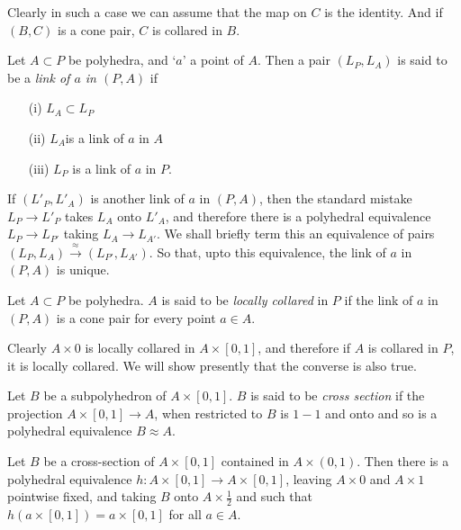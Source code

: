 Clearly in such a case we can assume that the map on $C$ is the identity. And if $(B,C)$ is a cone pair, $C$ is collared in $B$.

\begin{definition}\label{chap6-defi6.4.10}
Let $A\subset P$ be polyhedra, and `$a$' a point of $A$. Then a pair $(L_{P},L_{A})$ is said to be a {\em link of $a$ in $(P,A)$} if 
\begin{itemize}
\item[(i)] $L_{A}\subset L_{P}$

\item[(ii)] $L_{A}$\pageoriginale is a link of $a$ in $A$

\item[(iii)] $L_{P}$ is a link of $a$ in $P$.
\end{itemize}
\end{definition}

If $(L'_{P},L'_{A})$ is another link of $a$ in $(P,A)$, then the standard mistake $L_{P}\to L'_{P}$ takes $L_{A}$ onto $L'_{A}$, and therefore there is a polyhedral equivalence $L_{P}\to L_{P'}$ taking $L_{A}\to L_{A'}$. We shall briefly term this an equivalence of pairs $(L_{P},L_{A})\xrightarrow{\approx}(L_{P'},L_{A'})$. So that, upto this equivalence, the link of $a$ in $(P,A)$ is unique.

\begin{definition}\label{chap6-defi6.4.11}
Let $A\subset P$ be polyhedra. $A$ is said to be {\em locally collared} in $P$ if the link of $a$ in $(P,A)$ is a cone pair for every point $a\in A$.
\end{definition}

Clearly $A\times 0$ is locally collared in $A\times [0,1]$, and therefore if $A$ is collared in $P$, it is locally collared. We will show presently that the converse is also true.

\begin{definition}\label{chap6-defi6.4.12}
Let $B$ be a subpolyhedron of $A\times[0,1]$. $B$ is said to be {\em cross section} if the projection $A\times [0,1]\to A$, when restricted to $B$ is $1-1$ and onto and so is a polyhedral equivalence $B\approx A$.
\end{definition}

\begin{proposition}\label{chap6-prop6.4.13}
Let $B$ be a cross-section of $A\times[0,1]$ contained in $A\times (0,1)$. Then there is a polyhedral equivalence $h:A\times [0,1]\to A\times [0,1]$, leaving $A\times 0$ and $A\times 1$ pointwise fixed, and taking $B$ onto $A\times \frac{1}{2}$ and such that $h(a\times[0,1])=a\times[0,1]$ for all $a\in A$.
\end{proposition}

